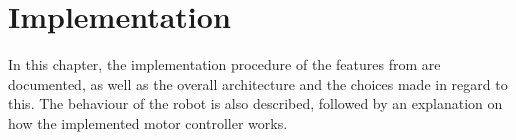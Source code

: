 \chapter{Implementation} \label{cha:implementation}

In this chapter, the implementation procedure of the features from  are documented, as well as the overall architecture and the choices made in regard to this. The behaviour of the robot is also described, followed by an explanation on how the implemented motor controller works.














%
%
%

%
